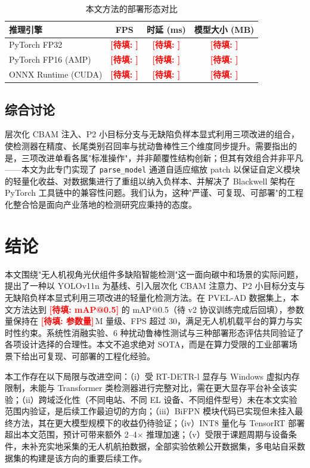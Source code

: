 \documentclass[journal,onecolumn,11pt]{IEEEtran}
\makeatletter
\newcommand{\TBF}[1]{\textcolor{red}{\textbf{[待填: #1]}}}
\newcommand{\mAPHalf}{\TBF{mAP@0.5}}
\newcommand{\paramsM}{\TBF{参数量}}
\makeatother
\begin{document}
\begin{table}[!t]
\caption{本文方法的部署形态对比}
\label{tab:deploy}
\centering
\renewcommand{\arraystretch}{1.2}
\begin{tabular}{@{}lccc@{}}
\toprule
推理引擎 & FPS & 时延 (ms) & 模型大小 (MB) \\
\midrule
PyTorch FP32         & \TBF{} & \TBF{} & \TBF{} \\
PyTorch FP16 (AMP)   & \TBF{} & \TBF{} & \TBF{} \\
ONNX Runtime (CUDA)  & \TBF{} & \TBF{} & \TBF{} \\
\bottomrule
\end{tabular}
\end{table}

\subsection{综合讨论}
\label{sec:discussion}
层次化 CBAM 注入、P2 小目标分支与无缺陷负样本显式利用三项改进的组合，使检测器在精度、长尾类别召回率与扰动鲁棒性三个维度同步提升。需要指出的是，三项改进单看各属"标准操作"，并非颠覆性结构创新；但其有效组合并非平凡——本文为此专门实现了 \texttt{parse\_model} 通道自适应缩放 patch 以保证自定义模块的轻量化收益、对数据集进行了重组以纳入负样本、并解决了 Blackwell 架构在 PyTorch 工具链中的兼容性问题。我们认为，这种"严谨、可复现、可部署"的工程化整合恰是面向产业落地的检测研究应秉持的态度。

\section{结论}
\label{sec:conclusion}

本文围绕"无人机视角光伏组件多缺陷智能检测"这一面向碳中和场景的实际问题，提出了一种以 YOLOv11n 为基线、引入层次化 CBAM 注意力、P2 小目标分支与无缺陷负样本显式利用三项改进的轻量化检测方法。在 PVEL-AD 数据集上，本文方法达到 \mAPHalf{} 的 mAP@0.5（待 v2 协议训练完成后回填），参数量保持在 \paramsM{}\,M 量级、FPS 超过 30，满足无人机机载平台的算力与实时性约束。系统性消融实验、6 种扰动鲁棒性测试与三种部署形态评估共同验证了各项设计选择的合理性。本文不追求绝对 SOTA，而是在算力受限的工业部署场景下给出可复现、可部署的工程化经验。

本工作存在以下局限与改进空间：（i）受 RT-DETR-l 显存与 Windows 虚拟内存限制，未能与 Transformer 类检测器进行完整对比，需在更大显存平台补全该实验；（ii）跨域泛化性（不同电站、不同 EL 设备、不同组件型号）未在本文实验范围内验证，是后续工作最迫切的方向；（iii）BiFPN 模块代码已实现但未挂入最终方法，其在更大模型规模下的收益仍待验证；（iv）INT8 量化与 TensorRT 部署超出本文范围，预计可带来额外 2--4$\times$ 推理加速；（v）受限于课题周期与设备条件，未补充实地采集的无人机航拍数据，全部实验依赖公开数据集，多电站自采数据集的构建是该方向的重要后续工作。
\end{document}
